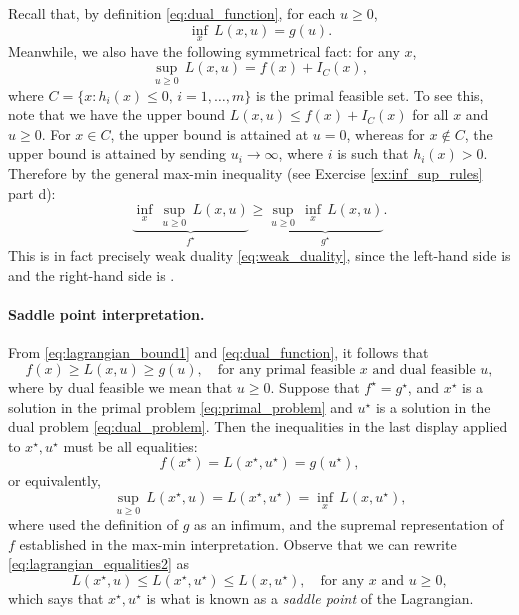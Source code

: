 Recall that, by definition \eqref{eq:dual_function}, for each $u \geq 0$,    
\[
\inf_x \, L(x,u) = g(u).
\]
Meanwhile, we also have the following symmetrical fact: for any $x$, 
\[
\sup_{u \geq 0} \, L(x,u) = f(x) + I_C(x),
\]
where $C = \{x : h_i(x) \leq 0, \, i=1,\dots,m\}$ is the primal feasible
set. To see this, note that we have the upper bound $L(x,u) \leq f(x) +
I_C(x)$ for all $x$ and $u \geq 0$. For $x \in C$, the upper bound is attained   
at $u = 0$, whereas for $x \notin C$, the upper bound is attained by sending 
$u_i \to \infty$, where $i$ is such that $h_i(x) > 0$. Therefore by the general
max-min inequality (see Exercise \ref{ex:inf_sup_rules} part d): 
\[
\underbrace{\inf_x \, \sup_{u \geq 0} \, L(x,u)}_{f^\star} \geq 
\underbrace{\sup_{u \geq 0} \, \inf_x \, L(x,u)}_{g^\star}.
\]
This is in fact precisely weak duality \eqref{eq:weak_duality}, since the 
left-hand side is  and the
right-hand side is . 

\paragraph{Saddle point interpretation.}

From \eqref{eq:lagrangian_bound1} and \eqref{eq:dual_function}, it follows that  
\[
f(x) \geq L(x,u) \geq g(u), \quad \text{for any primal feasible $x$ and dual
  feasible $u$}, 
\]
where by dual feasible we mean that $u \geq 0$. Suppose that $f^\star =
g^\star$, and $x^\star$ is a solution in the primal problem
\eqref{eq:primal_problem} and $u^\star$ is a solution in the dual problem
\eqref{eq:dual_problem}. Then the inequalities in the last display applied to
$x^\star,u^\star$ must be all equalities:  
\begin{equation}
\label{eq:lagrangian_equalities1}
f(x^\star) = L(x^\star, u^\star) = g(u^\star),
\end{equation}
or equivalently, 
\begin{equation}
\label{eq:lagrangian_equalities2}
\sup_{u \geq 0} \, L(x^\star, u) = L(x^\star, u^\star) = \inf_x \, L(x,
u^\star), 
\end{equation}
where used the definition of $g$ as an infimum, and the supremal representation
of $f$ established in the max-min interpretation. Observe that we can rewrite
\eqref{eq:lagrangian_equalities2} as
\begin{equation}
\label{eq:lagrangian_saddle_point}
L(x^\star, u) \leq L(x^\star, u^\star) \leq L(x, u^\star), \quad \text{for any
  $x$ and $u \geq 0$},
\end{equation}
which says that $x^\star,u^\star$ is what is known as a \emph{saddle point} of 
the Lagrangian. 

